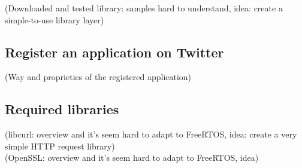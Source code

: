(Downloaded and tested library: samples hard to understand, idea: create a simple-to-use library layer)


\subsection{Register an application on Twitter}

(Way and proprieties of the registered application)


\subsection{Required libraries}

(libcurl: overview and it's seem hard to adapt to FreeRTOS, idea: create a very simple HTTP request library)\\
(OpenSSL: overview and it's seem hard to adapt to FreeRTOS, idea)




\clearpage